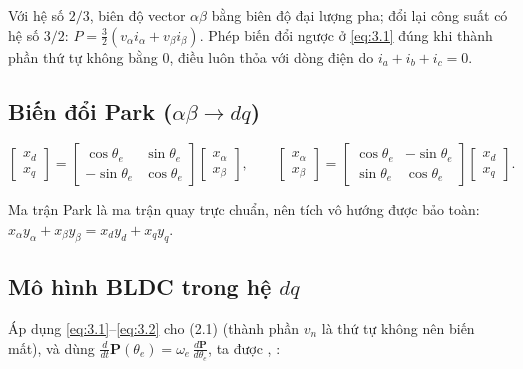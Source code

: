 Với hệ số $2/3$, biên độ vector $\alpha\beta$ bằng biên độ đại lượng pha; đổi lại công suất có hệ số $3/2$: $P = \tfrac32 (v_\alpha i_\alpha + v_\beta i_\beta)$. Phép biến đổi ngược ở \eqref{eq:3.1} đúng khi thành phần thứ tự không bằng 0, điều luôn thỏa với dòng điện do $i_a+i_b+i_c=0$.

\subsection{\texorpdfstring{Biến đổi Park ($\alpha\beta\to dq$)}{Biến đổi Park (αβ→ dq)}}\label{sec:3.2}

\begin{equation}
\begin{bmatrix} x_d \\ x_q \end{bmatrix}
= \begin{bmatrix} \cos\theta_e & \sin\theta_e \\ -\sin\theta_e & \cos\theta_e \end{bmatrix}
\begin{bmatrix} x_\alpha \\ x_\beta \end{bmatrix},
\qquad
\begin{bmatrix} x_\alpha \\ x_\beta \end{bmatrix}
= \begin{bmatrix} \cos\theta_e & -\sin\theta_e \\ \sin\theta_e & \cos\theta_e \end{bmatrix}
\begin{bmatrix} x_d \\ x_q \end{bmatrix}.
\tag{3.2}\label{eq:3.2}
\end{equation}

Ma trận Park là ma trận quay trực chuẩn, nên tích vô hướng được bảo toàn: $x_\alpha y_\alpha + x_\beta y_\beta = x_d y_d + x_q y_q$.

\subsection{\texorpdfstring{Mô hình BLDC trong hệ $dq$}{Mô hình BLDC trong hệ dq}}\label{sec:3.3}

Áp dụng \eqref{eq:3.1}–\eqref{eq:3.2} cho (2.1) (thành phần $v_n$ là thứ tự không nên biến mất), và dùng $\frac{d}{dt}\mathbf{P}(\theta_e) = \omega_e\,\frac{d\mathbf{P}}{d\theta_e}$, ta được \cite{r3}, \cite{r4}:

